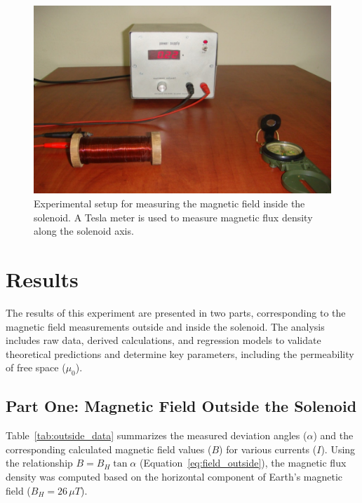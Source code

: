 \documentclass[journal]{IEEEtran}
\begin{document}
\begin{figure}[H]
    \centering
    \includegraphics[width=\linewidth]{IMAGES/Multi-turn_Coi_Experimental_setup.png}
    \caption{Experimental setup for measuring the magnetic field inside the solenoid. A Tesla meter is used to measure magnetic flux density along the solenoid axis.}
    \label{fig:Inside_setup}
\end{figure}

    
    \section{Results}

    The results of this experiment are presented in two parts, corresponding to the magnetic field measurements outside and inside the solenoid. The analysis includes raw data, derived calculations, and regression models to validate theoretical predictions and determine key parameters, including the permeability of free space (\( \mu_0 \)).
    
    \subsection{Part One: Magnetic Field Outside the Solenoid}
    Table~\ref{tab:outside_data} summarizes the measured deviation angles (\( \alpha \)) and the corresponding calculated magnetic field values (\( B \)) for various currents (\( I \)). Using the relationship \( B = B_H \tan \alpha \) (Equation~\ref{eq:field_outside}), the magnetic flux density was computed based on the horizontal component of Earth's magnetic field (\( B_H = 26 \, \mu T \)).
\end{document}

